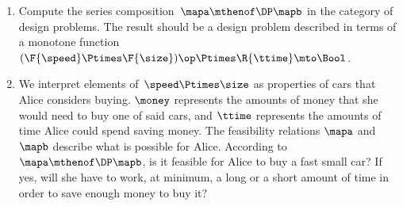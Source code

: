 \begin{gradedexercise}
    \begin{enumerate}
        \item Compute the series composition~$\mapa \mthenof\DP \mapb$ in the category of design problems.
              The result should be a design problem described in terms of a monotone function~$(\F{\speed} \Ptimes \F{\size})\op \Ptimes \R{\ttime} \mto \Bool$.
        \item We interpret elements of~$\speed \Ptimes \size$ as properties of cars that Alice considers buying.
              $\money$ represents the amounts of money that she would need to buy one of said cars, and $\ttime$ represents the amounts of time Alice could spend saving money.
              The feasibility relations $\mapa$ and~$\mapb$ describe what is possible for Alice.
              According to~$\mapa \mthenof\DP \mapb$, is it feasible for Alice to buy a fast small car?
              If yes, will she have to work, at minimum, a long or a short amount of time in order to save enough money to buy it?
    \end{enumerate}
\end{gradedexercise}

